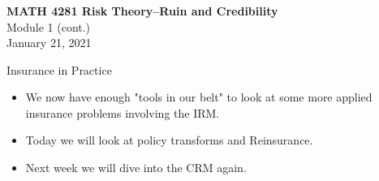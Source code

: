 \documentclass[11pt]{beamer}
\begin{document}
\begin{frame}
  \frametitle{}
  \begin{center}
    \textbf{\large MATH 4281 Risk Theory--Ruin and Credibility}\\
    \vspace{1cm}
    {\large  Module 1 (cont.)} \\
    \vspace{1cm}
    {\large  January 21, 2021}
    \end{center}
    \vspace{1cm}
\end{frame}
\begin{frame}{Insurance in Practice}

\begin{itemize}

\item We now have enough "tools in our belt" to look at some more applied insurance problems involving the IRM. 

\vfill

\item Today we will look at policy transforms and Reinsurance.

\vfill

\item Next week we will dive into the CRM again.

\end{itemize}

\end{frame}
\begin{frame}
\tableofcontents
\end{frame}
\end{document}
